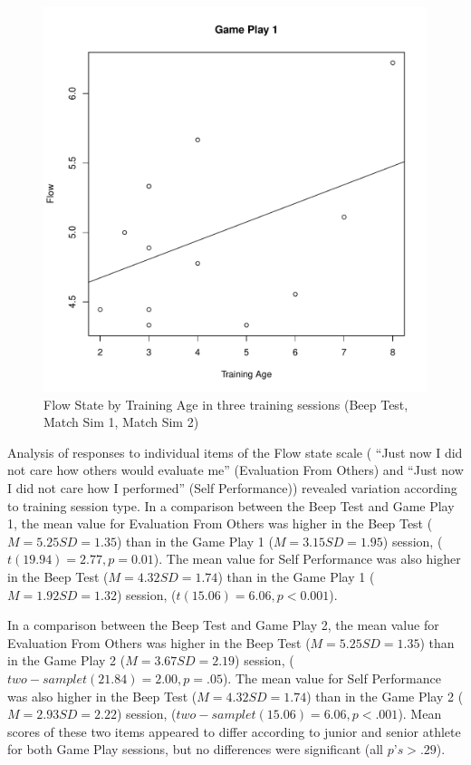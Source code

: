 \begin{CJK}{UTF8}{gbsn}
\begin{figure}[htbp]
\includegraphics[scale=.2]{images/flow0109TrainingAge.pdf}
  \caption{Flow State by Training Age in three training sessions (Beep Test, Match Sim 1, Match Sim 2)}
  \label{fig:flowTrainingAge}
\end{figure}

Analysis of responses to individual items of the Flow state scale ( ``Just now I did not care how others would evaluate me'' (Evaluation From Others) and ``Just now I did not care how I performed'' (Self Performance)) revealed variation according to training session type.  In a comparison between the Beep Test and Game Play 1, the mean value for Evaluation From Others was higher in the Beep Test ($M = 5.25 SD = 1.35$) than in the Game Play 1 ($M = 3.15 SD = 1.95$) session, ($t(19.94) = 2.77, p = 0.01$).  The mean value for Self Performance was also higher in the Beep Test ($M = 4.32 SD = 1.74$) than in the Game Play 1 ($M = 1.92 SD = 1.32$) session, ($t(15.06) = 6.06, p < 0.001$).

In a comparison between the Beep Test and Game Play 2, the mean value for Evaluation From Others was higher in the Beep Test ($M = 5.25 SD = 1.35$) than in the Game Play 2 ($M = 3.67 SD = 2.19$) session, ($two-sample t(21.84) = 2.00, p = .05$).   The mean value for Self Performance was also higher in the Beep Test ($M = 4.32 SD = 1.74$) than in the Game Play 2 ($M = 2.93 SD = 2.22$) session, ($two-sample t(15.06) = 6.06, p < .001$).  Mean scores of these two items appeared to differ according to junior and senior athlete for both Game Play sessions, but no differences were significant (all $p’s > .29$).


\end{CJK}
